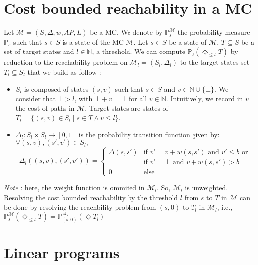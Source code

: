\section{Cost bounded reachability in a MC}

Let $\mathcal{M} = (S, \Delta, w, AP, L)$ be a MC. We denote by $\mathbb{P}^\mathcal{M}_s$ the probability measure $\mathbb{P}_s$ such that $s \in S$ is a state of the MC $\mathcal{M}$.
Let $s \in S$ be a state of $\mathcal{M}$, $T \subseteq S$ be a set of target states and $l \in \mathbb{N}$, a threshold.
We can compute $\mathbb{P}_s(\Diamond_{\leq l} T)$ by reduction to the reachability problem on $\mathcal{M}_l = (S_l, \Delta_l)$ to the target states set $T_l \subseteq S_l$ that we build as follow :
\begin{itemize}
	\item $S_l$ is composed of states $(s, v)$ such that $s \in S $ and $v \in \mathbb{N} \cup \{ \bot \}$. We consider that $\bot > l$, with $\bot + v = \bot$ for all $v \in \mathbb{N}$. Intuitively, we record in $v$ the cost of paths in $\mathcal{M}$. Target states are states of $T_l = \{ (s, v) \in S_l \; | \; s \in T \wedge v \leq l \}$.
	\item $\Delta_l: S_l \times S_l \rightarrow [0,1]$ is the probability transition function given by:\\
	$\forall (s, v), (s', v') \in S_l,$
	\[
		\Delta_l((s, v), (s', v')) =
		\begin{cases}
		\Delta(s, s') & \text{if $v' = v + w(s, s')$ and $v' \leq b$  or} \\
		 & \text{if $v' = \bot$ and $v + w(s, s') > b$} \\
		 0 & \text{else}
		\end{cases}
	\]
\end{itemize}
\textit{Note} : here, the weight function is ommited in $\mathcal{M}_l$. So, $\mathcal{M}_l$ is unweighted. \\
Resolving the cost bounded reachability by the threshold $l$ from $s$ to $T$ in $\mathcal{M}$ can be done by resolving the reachbility problem from $(s, 0)$ to $T_l$ in $\mathcal{M}_l$, i.e., $\mathbb{P}^\mathcal{M}_s(\Diamond_{\leq l} T) = \mathbb{P}^{\mathcal{M}_l}_{(s, 0)}(\Diamond T_l)$

\section{Linear programs}
